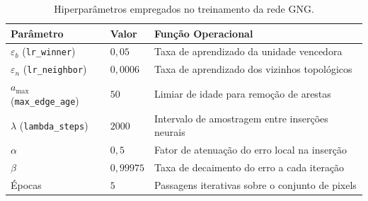 \documentclass[11pt,a4paper]{article}
\begin{document}
\begin{table}[H]
\centering
\caption{Hiperparâmetros empregados no treinamento da rede GNG.}
\label{tab:gng-hp}
\begin{tabular}{lll}
\toprule
Parâmetro & Valor & Função Operacional \\
\midrule
$\varepsilon_b$ (\texttt{lr\_winner})   & $0{,}05$     & Taxa de aprendizado da unidade vencedora \\
$\varepsilon_n$ (\texttt{lr\_neighbor}) & $0{,}0006$   & Taxa de aprendizado dos vizinhos topológicos \\
$a_{\max}$ (\texttt{max\_edge\_age})    & $50$         & Limiar de idade para remoção de arestas \\
$\lambda$ (\texttt{lambda\_steps})      & $2000$       & Intervalo de amostragem entre inserções neurais \\
$\alpha$                                & $0{,}5$      & Fator de atenuação do erro local na inserção \\
$\beta$                                 & $0{,}99975$  & Taxa de decaimento do erro a cada iteração \\
Épocas                                  & $5$          & Passagens iterativas sobre o conjunto de pixels \\
\bottomrule
\end{tabular}
\end{table}
\end{document}
